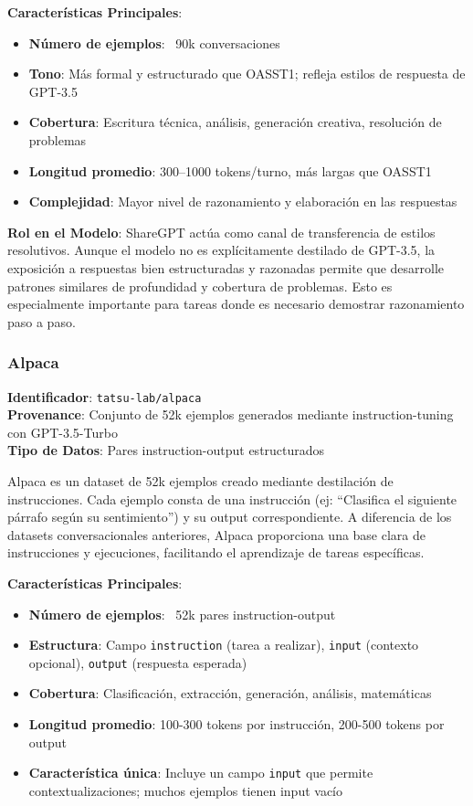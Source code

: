 \textbf{Características Principales}:
\begin{itemize}
    \item \textbf{Número de ejemplos}: ~90k conversaciones
    \item \textbf{Tono}: Más formal y estructurado que OASST1; refleja estilos de respuesta de GPT-3.5
    \item \textbf{Cobertura}: Escritura técnica, análisis, generación creativa, resolución de problemas
    \item \textbf{Longitud promedio}: 300--1000 tokens/turno, más largas que OASST1
    \item \textbf{Complejidad}: Mayor nivel de razonamiento y elaboración en las respuestas
\end{itemize}

\textbf{Rol en el Modelo}: ShareGPT actúa como canal de transferencia de estilos resolutivos. Aunque el modelo no es explícitamente destilado de GPT-3.5, la exposición a respuestas bien estructuradas y razonadas permite que desarrolle patrones similares de profundidad y cobertura de problemas. Esto es especialmente importante para tareas donde es necesario demostrar razonamiento paso a paso.

\subsubsection{Alpaca}

\textbf{Identificador}: \texttt{tatsu-lab/alpaca}~\cite{taori2023alpaca} \\
\textbf{Provenance}: Conjunto de 52k ejemplos generados mediante instruction-tuning con GPT-3.5-Turbo \\
\textbf{Tipo de Datos}: Pares instruction-output estructurados

Alpaca es un dataset de 52k ejemplos creado mediante destilación de instrucciones. Cada ejemplo consta de una instrucción (ej: ``Clasifica el siguiente párrafo según su sentimiento'') y su output correspondiente. A diferencia de los datasets conversacionales anteriores, Alpaca proporciona una base clara de instrucciones y ejecuciones, facilitando el aprendizaje de tareas específicas.

\textbf{Características Principales}:
\begin{itemize}
    \item \textbf{Número de ejemplos}: ~52k pares instruction-output
    \item \textbf{Estructura}: Campo \texttt{instruction} (tarea a realizar), \texttt{input} (contexto opcional), \texttt{output} (respuesta esperada)
    \item \textbf{Cobertura}: Clasificación, extracción, generación, análisis, matemáticas
    \item \textbf{Longitud promedio}: 100-300 tokens por instrucción, 200-500 tokens por output
    \item \textbf{Característica única}: Incluye un campo \texttt{input} que permite contextualizaciones; muchos ejemplos tienen input vacío
\end{itemize}

